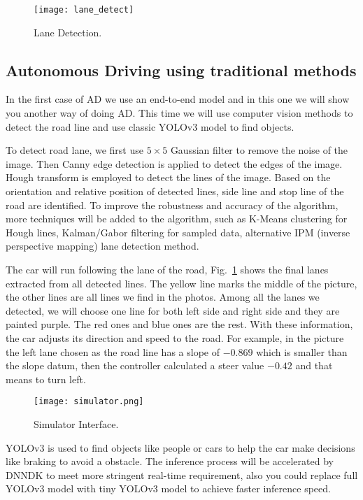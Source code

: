 \begin{figure}[b]
    \centering
    \texttt{[image: lane\_detect]}
    \caption{Lane Detection.}
    \label{fig:lane_detection}
\end{figure}

\subsection{Autonomous Driving using traditional methods}
In the first case of AD we use an end-to-end model and in this one we will show you another way of doing AD. This time we will use computer vision methods to detect the road line and use classic YOLOv3 model to find objects.  

To detect road lane, we first use $5 \times 5$ Gaussian filter to remove the noise of the image. Then Canny edge detection\cite{canny1986computational} is applied to detect the edges of the image. Hough transform\cite{burns1986extracting} is employed to detect the lines of the image. Based on the orientation and relative position of detected lines, side line and stop line of the road are identified. To improve the robustness and accuracy of the algorithm, more techniques will be added to the algorithm, such as K-Means clustering\cite{selim1984k} for Hough lines, Kalman/Gabor filtering for sampled data, alternative IPM (inverse perspective mapping) lane detection method\cite{wang2014approach}.

The car will run following the lane of the road, Fig.~\ref{fig:lane_detection} shows the final lanes extracted from all detected lines. The yellow line marks the middle of the picture, the other lines are all lines we find in the photos. Among all the lanes we detected, we will choose one line for both left side and right side and they are painted purple. The red ones and blue ones are the rest. With these information, the car adjusts its direction and speed to the road. For example, in the picture the left lane chosen as the road line has a slope of $-0.869$ which is smaller than the slope datum, then the controller calculated a steer value $-0.42$ and that means to turn left.

\begin{figure}[b]
\centerline{\texttt{[image: simulator.png]}}
\caption{Simulator Interface.}
\label{si}
\end{figure}

YOLOv3 is used to find objects like people or cars to help the car make decisions like braking to avoid a obstacle. The inference process will be accelerated by DNNDK to meet more stringent real-time requirement, also you could replace full YOLOv3 model with tiny YOLOv3 model to achieve faster inference speed.

